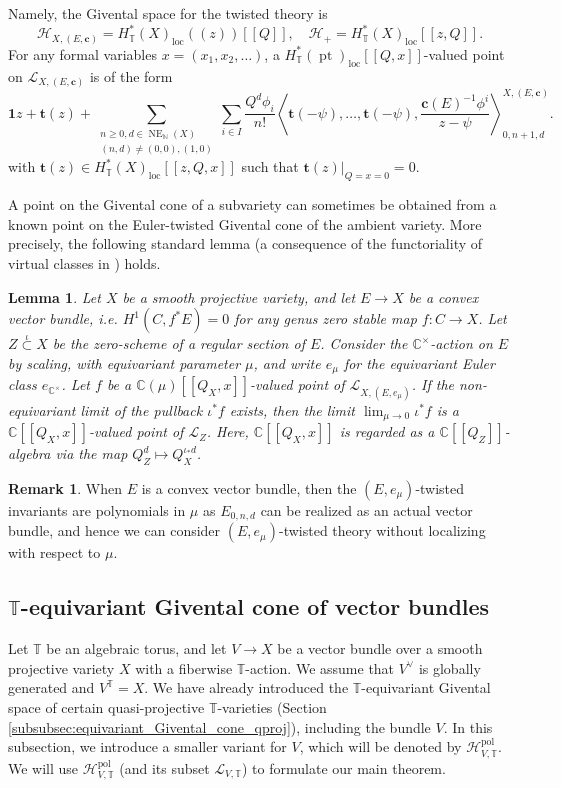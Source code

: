 \documentclass[a4paper,12pt]{amsart}
\numberwithin{equation}{section}
\newtheorem{lemma}[theorem]{Lemma}
\theoremstyle{definition}
\newtheorem{remark}[theorem]{Remark}
\newcommand{\C}{\mathbb{C}}
\newcommand{\N}{\mathbb{N}}
\newcommand{\T}{\mathbb{T}}
\newcommand{\bc}{\boldsymbol{c}}
\newcommand{\bone}{\mathbf{1}}
\newcommand{\bt}{\mathbf{t}}
\newcommand{\cH}{\mathcal{H}}
\newcommand{\cL}{\mathcal{L}}
\newcommand{\loc}{{\operatorname{loc}}}
\newcommand{\pol}{{\operatorname{pol}}}
\newcommand{\pt}{\operatorname{pt}}
\newcommand{\NE}{\operatorname{NE}_{\N}}
\def\corr#1{\left\langle#1 \right\rangle}
\begin{document}
Namely, the Givental space for the twisted theory is
\[
\cH_{X,(E,\bc)} = H^*_\T(X)_\loc(\!(z)\!)[\![Q]\!], \quad \cH_+ = H^*_\T(X)_\loc[\![z,Q]\!].
\]
For any formal variables $x=(x_1,x_2,\dots)$, a $H^*_\T(\pt)_\loc[\![Q,x]\!]$-valued point on $\cL_{X,(E,\bc)}$ is of the form
\[
\bone z + \bt(z) + \sum_{ \substack{n\geq0,d\in\NE(X) \\ (n,d)\neq(0,0),(1,0)} } \sum_{i\in I} \frac{Q^d\phi_i}{n!} \corr{\bt(-\psi),\dots,\bt(-\psi),\frac{\bc(E)^{-1}\phi^i}{z-\psi}}^{X,(E,\bc)}_{0,n+1,d}.
\]
with $\bt(z)\in H^*_\T(X)_\loc[\![z,Q,x]\!]$ such that $\bt(z)|_{Q=x=0}=0$.

A point on the Givental cone of a subvariety can sometimes be obtained from a known point on the Euler-twisted Givental cone of the ambient variety. 
More precisely, the following standard lemma (a consequence of the functoriality of virtual classes in \cite{KKP:functoriality})  holds.

\begin{lemma}\label{lem:I-function_of_subvarieties}
    Let $X$ be a smooth projective variety, and let $E\to X$ be a convex vector bundle, i.e. $H^1(C,f^*E)=0$ for any genus zero stable map $f\colon C\to X$. Let $Z\stackrel{\iota}{\subset} X$ be the zero-scheme of a regular section of $E$. Consider the $\C^\times$-action on $E$ by scaling, with equivariant parameter $\mu$, and write $e_\mu$ for the equivariant Euler class $e_{\C^\times}$.
    Let $f$ be a $\C(\mu)[\![Q_X,x]\!]$-valued point of $\cL_{X,(E,e_\mu)}$.
    If the non-equivariant limit of the pullback $\iota^*f$ exists, then the limit $\lim_{\mu\to0}\iota^*f$ is a $\C[\![Q_X,x]\!]$-valued point of $\cL_{Z}$.
    Here, $\C[\![Q_X,x]\!]$ is regarded as a $\C[\![Q_Z]\!]$-algebra via the map $Q_Z^d\mapsto Q_X^{\iota_*d}$.
\end{lemma}

\begin{remark}
    When $E$ is a convex vector bundle, then the $(E,e_\mu)$-twisted invariants are polynomials in $\mu$ as $E_{0,n,d}$ can be realized as an actual vector bundle, and hence we can consider $(E,e_\mu)$-twisted theory without localizing with respect to $\mu$.
\end{remark}

\subsection{$\T$-equivariant Givental cone of vector bundles}\label{subsec:equivariant_Givental_cone_vector_bundles}
Let $\T$ be an algebraic torus, and let $V\to X$ be a vector bundle over a smooth projective variety $X$ with a fiberwise $\T$-action.
We assume that $V^\vee$ is globally generated and $V^\T=X$.
We have already introduced the $\T$-equivariant Givental space of certain quasi-projective $\T$-varieties (Section \ref{subsubsec:equivariant_Givental_cone_qproj}), including the bundle $V$.
In this subsection, we introduce a smaller variant for $V$, which will be denoted by $\cH_{V,\T}^\pol$.
We will use $\cH_{V,\T}^\pol$ (and its subset $\cL_{V,\T}$) to formulate our main theorem.
\end{document}
